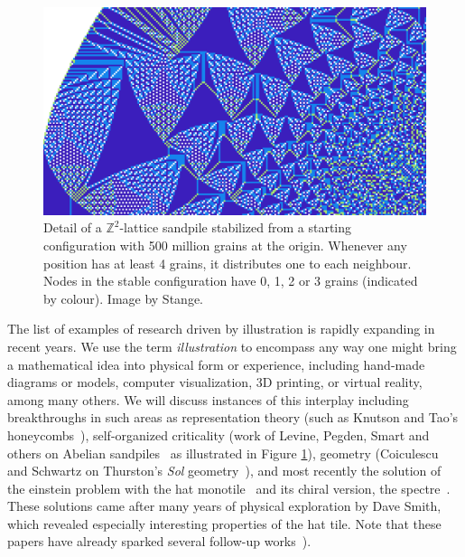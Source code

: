 \documentclass{notices}
\begin{document}
\begin{figure}
    \centering
    \includegraphics[width=0.95\linewidth]{images/close-sandpile.png}
    \caption{Detail of a $\mathbb{Z}^2$-lattice sandpile stabilized from a starting configuration with 500 million grains at the origin.  Whenever any position has at least 4 grains, it distributes one to each neighbour.  Nodes in the stable configuration have 0, 1, 2 or 3 grains (indicated by colour).  Image by Stange.}
    \label{fig:sandpile}
\end{figure}

The list of examples of research driven by illustration is rapidly expanding in recent years. 
We use the term \emph{illustration} to encompass any way one might bring a mathematical idea into physical form or experience, including hand-made diagrams or models, computer visualization, 3D printing, or virtual reality, among many others. 
We will discuss instances of this interplay including breakthroughs in such areas as representation theory (such as Knutson and Tao's honeycombs~\cites{honeycombAMS,honeycomb1,honeycomb2}), self-organized criticality (work of Levine, Pegden, Smart and others on Abelian sandpiles~\cite{LPS17} as illustrated in Figure \ref{fig:sandpile}), geometry (Coiculescu and Schwartz on Thurston's \emph{Sol} geometry~\cite{coiculescu2022sol}), and most recently the solution of the einstein problem with the hat monotile~\cite{smith2023aperiodic} and its chiral version, the spectre~\cite{smith2023chiral}. 
These solutions came after many years of physical exploration by Dave Smith, which revealed especially interesting properties of the hat tile.
Note that these papers have already sparked several follow-up works~\cites{reitebuch2023direct,baake2023dynamics,socolar2023quasicrystalline}).
\end{document}
